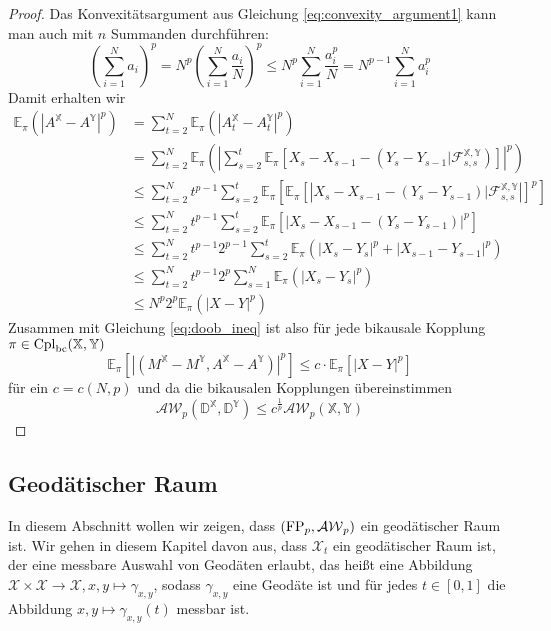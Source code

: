 \begin{proof}
    Das Konvexitätsargument aus Gleichung \ref{eq:convexity_argument1} kann man auch mit $n$ Summanden durchführen: 
    $$\left(\sum_{i=1}^N a_i\right)^p = N^{p} \left(\sum_{i=1}^N \frac{a_i}{N}\right)^p \leq N^p \sum_{i=1}^N \frac{a_i^p}{N} = N^{p-1} \sum_{i=1}^N a_i^p$$
    Damit erhalten wir 
    \begin{align*}
        \mathbb{E}_\pi(|A^\mathbb{X} - A^\mathbb{Y}|^p) &= \sum_{t=2}^N\mathbb{E}_\pi(|A_t^\mathbb{X} - A_t^\mathbb{Y}|^p) \\
        &= \sum_{t=2}^N \mathbb{E}_\pi\left(\left| \sum_{s=2}^t \mathbb{E}_\pi\left[X_s - X_{s-1} - (Y_s - Y_{s-1} \vert \mathcal{F}_{s,s}^\mathbb{X,Y}) \right]\right|^p \right) \\
        &\leq \sum_{t=2}^N t^{p-1} \sum_{s=2}^t \mathbb{E}_\pi\left[\mathbb{E}_\pi\left[ \left|X_s - X_{s-1} - (Y_s - Y_{s-1}) \vert \mathcal{F}_{s,s}^\mathbb{X,Y} \right|\right]^p\right] \\
        &\leq \sum_{t=2}^N t^{p-1}\sum_{s=2}^t \mathbb{E}_\pi\left[ \left|X_{s}-X_{s-1} - (Y_s - Y_{s-1}) \right|^p\right] \\
        &\leq \sum_{t=2}^N t^{p-1}2^{p-1}\sum_{s=2}^t \mathbb{E}_\pi(|X_s - Y_{s}|^p + |X_{s-1}-Y_{s-1}|^p) \\
        &\leq \sum_{t=2}^N t^{p-1}2^{p} \sum_{s=1}^N \mathbb{E}_\pi(|X_s - Y_s|^p) \\
        &\leq N^p2^p \mathbb{E}_\pi(|X-Y|^p)
    \end{align*}
    Zusammen mit Gleichung \ref{eq:doob_ineq} ist also für jede bikausale Kopplung $\pi \in \operatorname{Cpl}_{\operatorname{bc}}(\mathbb{X,Y})$
    $$\mathbb{E}_\pi\left[\left|(M^\mathbb{X}-M^\mathbb{Y}, A^\mathbb{X}-A^\mathbb{Y}) \right|^p \right]  \leq c\cdot \mathbb{E}_\pi \left[ \left| X-Y\right|^p\right]$$
    für ein $c=c(N,p)$ und da die bikausalen Kopplungen übereinstimmen
    $$\mathcal{AW}_p(\mathbb{D}^\mathbb{X}, \mathbb{D}^\mathbb{Y}) \leq c^\frac{1}{p} \mathcal{AW}_p(\mathbb{X,Y})$$
\end{proof}

\subsection{Geodätischer Raum}
In diesem Abschnitt wollen wir zeigen, dass $(\operatorname{FP}_p, \mathcal{AW}_p)$ ein geodätischer Raum ist. Wir gehen in diesem Kapitel davon aus, dass $\mathcal{X}_t$ ein geodätischer Raum ist, der eine messbare Auswahl von Geodäten erlaubt, das heißt eine Abbildung $\mathcal{X}\times\mathcal{X} \rightarrow \mathcal{X}, x,y \mapsto \gamma_{x,y}$, sodass $\gamma_{x,y}$ eine Geodäte ist und für jedes $t\in[0,1]$ die Abbildung $x,y\mapsto \gamma_{x,y}(t)$ messbar ist.

